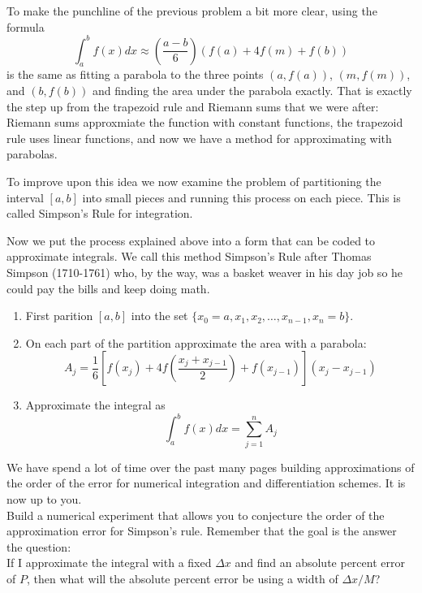 To make the punchline of the previous problem a bit more clear, using the formula 
\[ \int_a^b f(x) dx \approx \left( \frac{a-b}{6} \right) \left( f(a) + 4 f(m) + f(b)
\right) \]
is the same as fitting a parabola to the three points $(a,f(a))$, $(m,f(m))$, and
$(b,f(b))$ and finding the area under the parabola exactly.  That is exactly the step up
from the trapezoid rule and Riemann sums that we were after: Riemann sums approxmiate the
function with constant functions, the trapezoid rule uses linear functions, and now we
have a method for approximating with parabolas.  

To improve upon this idea we now examine the problem of partitioning the interval $[a,b]$
into small pieces and running this process on each piece.  This is called Simpson's Rule
for integration.

\begin{technique}
    Now we put the process explained above into a form that can be coded to approximate
    integrals. We call this method Simpson's Rule after Thomas Simpson (1710-1761) who, by
    the way, was a basket weaver in his day job so he could pay the bills and keep doing
    math.
    \begin{enumerate}
        \item First parition $[a,b]$ into the set $\{x_0=a, x_1, x_2, \ldots, x_{n-1},
        x_n=b\}$.
        \item On each part of the partition approximate the area with a parabola:
            \[ A_j = \frac{1}{6} \left[ f(x_j) + 4 f\left( \frac{x_j+x_{j-1}}{2} \right) +
                f(x_{j-1}) \right]\left( x_j - x_{j-1} \right) \]
        \item Approximate the integral as
            \[ \int_a^b f(x) dx = \sum_{j=1}^n A_j \]
    \end{enumerate}
\end{technique}

\begin{problem}
    We have spend a lot of time over the past many pages building approximations of the
    order of the error for numerical integration and differentiation schemes.  It is now
    up to you.  \\
    Build a numerical experiment that allows you to conjecture the order of the
    approximation error for Simpson's rule.  Remember that the goal is the answer the
    question: \\
    If I approximate the integral with a fixed $\Delta x$ and find an absolute percent
    error of $P$, then what will the absolute percent error be using a width of $\Delta x
    / M$?
\end{problem}

